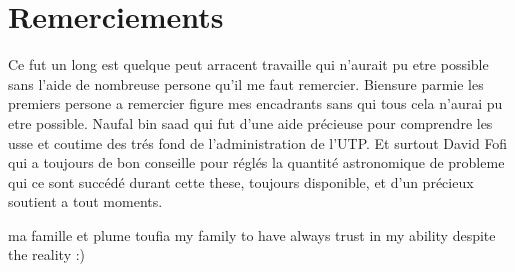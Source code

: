 \documentclass[english]{spimubphdthesis}
\begin{document}
\chapter*{Remerciements}
Ce fut un long est  quelque peut arracent travaille qui n'aurait pu etre possible sans l'aide de nombreuse persone  qu'il me faut remercier.
Biensure parmie les premiers persone a remercier figure mes encadrants sans qui tous cela n'aurai pu etre possible.
Naufal bin saad qui fut d'une aide précieuse  pour comprendre  les usse et coutime des trés fond de l'administration de l'UTP.
Et surtout David Fofi qui a toujours de bon conseille pour réglés la quantité astronomique de probleme qui ce sont succédé durant cette these, toujours disponible, et d'un précieux soutient a tout moments. 

 ma famille  et plume toufia 
 my family to have always trust in my ability despite the reality :)
\tableofcontents

\mainmatter
\end{document}
